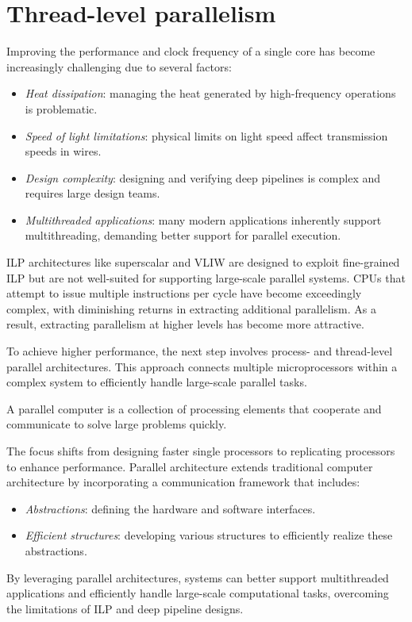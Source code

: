 \section{Thread-level parallelism}

Improving the performance and clock frequency of a single core has become increasingly challenging due to several factors:
\begin{itemize}
    \item \textit{Heat dissipation}: managing the heat generated by high-frequency operations is problematic.
    \item \textit{Speed of light limitations}: physical limits on light speed affect transmission speeds in wires.
    \item \textit{Design complexity}: designing and verifying deep pipelines is complex and requires large design teams.
    \item \textit{Multithreaded applications}: many modern applications inherently support multithreading, demanding better support for parallel execution.
\end{itemize}
ILP architectures like superscalar and VLIW are designed to exploit fine-grained ILP but are not well-suited for supporting large-scale parallel systems. 
CPUs that attempt to issue multiple instructions per cycle have become exceedingly complex, with diminishing returns in extracting additional parallelism. 
As a result, extracting parallelism at higher levels has become more attractive.

To achieve higher performance, the next step involves process- and thread-level parallel architectures. 
This approach connects multiple microprocessors within a complex system to efficiently handle large-scale parallel tasks.
\begin{definition}
    A parallel computer is a collection of processing elements that cooperate and communicate to solve large problems quickly.
\end{definition}
The focus shifts from designing faster single processors to replicating processors to enhance performance. 
Parallel architecture extends traditional computer architecture by incorporating a communication framework that includes:
\begin{itemize}
    \item \textit{Abstractions}: defining the hardware and software interfaces.
    \item \textit{Efficient structures}: developing various structures to efficiently realize these abstractions.
\end{itemize}
By leveraging parallel architectures, systems can better support multithreaded applications and efficiently handle large-scale computational tasks, overcoming the limitations of ILP and deep pipeline designs.

